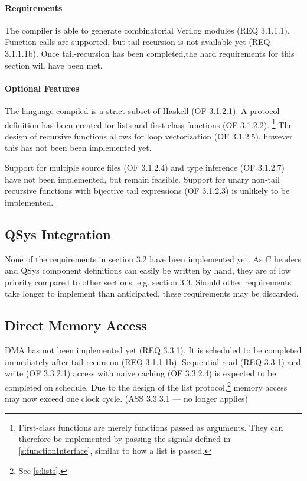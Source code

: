 \documentclass[english,onecolumn]{article}
\begin{document}
\paragraph{Requirements}
The compiler is able to generate combinatorial Verilog modules (REQ 3.1.1.1). Function calls are supported, but tail-recursion is not available yet (REQ 3.1.1.1b).
Once tail-recursion has been completed,\footnotemark the hard requirements for this section will have been met.

\paragraph{Optional Features}
The language compiled is a strict subset of Haskell (OF 3.1.2.1). A protocol definition has been created for lists and first-class functions (OF 3.1.2.2).%
\footnote{First-class functions are merely functions passed as arguments. They can therefore be implemented by passing the signals defined in \ref{s:functionInterface}, similar to how a list is passed.}
The design of recursive functions allows for loop vectorization (OF 3.1.2.5), however this has not been been implemented yet.

Support for multiple source files (OF 3.1.2.4) and type inference (OF 3.1.2.7) have not been implemented, but remain feasible. Support for unary non-tail recursive functions with bijective tail expressions (OF 3.1.2.3) is unlikely to be implemented.

\subsection{QSys Integration}
None of the requirements in section 3.2 have been implemented yet.
As C headers and QSys component definitions can easily be written by hand, they are of low priority compared to other sections. e.g. section 3.3. Should other requirements take longer to implement than anticipated, these requirements may be discarded.

\subsection{Direct Memory Access}
DMA has not been implemented yet (REQ 3.3.1). It is scheduled to be completed immediately after tail-recursion (REQ 3.1.1.1b). 
Sequential read (REQ 3.3.1) and write (OF 3.3.2.1) access with naive caching (OF 3.3.2.4) is expected to be completed on schedule. 
Due to the design of the list protocol,\footnote{See \ref{s:lists}.} memory access may now exceed one clock cycle. (ASS 3.3.3.1 --- no longer applies)
\end{document}
